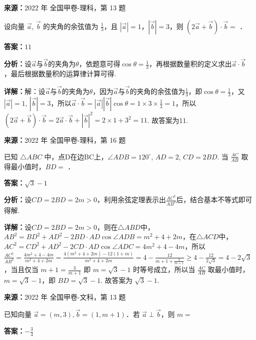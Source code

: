 \begin{question}[points=5]
\textbf{来源：}2022 年 全国甲卷-理科，第 13 题\par
设向量 $\vec{a}$, $\vec{b}$ 的夹角的余弦值为 $\frac{1}{3}$，且 $|\vec{a}|=1$，$|\vec{b}|=3$，则 $(2\vec{a}+\vec{b})\cdot\vec{b}=$ ．
\fillin[{$11$}]
\begin{solution}
\textbf{答案：}$11$

\textbf{分析：}设$\vec{a}$与$\vec{b}$的夹角为$\theta$，依题意可得$\cos\theta=\frac{1}{3}$，再根据数量积的定义求出$\vec{a}\cdot\vec{b}$，最后根据数量积的运算律计算可得.

\textbf{详解：}解：设$\vec{a}$与$\vec{b}$的夹角为$\theta$，因为$\vec{a}$与$\vec{b}$的夹角的余弦值为$\frac{1}{3}$，即$\cos\theta=\frac{1}{3}$，又$|\vec{a}|=1$, $|\vec{b}|=3$，所以$\vec{a}\cdot\vec{b}=|\vec{a}||\vec{b}|\cos\theta=1\times3\times\frac{1}{3}=1$，所以$(2\vec{a}+\vec{b})\cdot\vec{b}=2\vec{a}\cdot\vec{b}+|\vec{b}|^2=2\times1+3^2=11$. 故答案为11.
\end{solution}
\end{question}

\begin{question}[points=5]
\textbf{来源：}2022 年 全国甲卷-理科，第 16 题\par
已知 $\triangle ABC$ 中，点D在边BC上，$\angle ADB=120^\circ$, $AD=2$, $CD=2BD$. 当 $\frac{AC}{AB}$ 取得最小值时，$BD=$ ．
\fillin[{$\sqrt{3}-1$}]
\begin{solution}
\textbf{答案：}$\sqrt{3}-1$

\textbf{分析：}设$CD=2BD=2m>0$，利用余弦定理表示出$\frac{AC^2}{AB^2}$后，结合基本不等式即可得解.

\textbf{详解：}设$CD=2BD=2m>0$，则在$\triangle ABD$中，$AB^2=BD^2+AD^2-2BD\cdot AD\cos\angle ADB=m^2+4+2m$，在$\triangle ACD$中，$AC^2=CD^2+AD^2-2CD\cdot AD\cos\angle ADC=4m^2+4-4m$，所以 $\frac{AC^2}{AB^2}=\frac{4m^2+4-4m}{m^2+4+2m}=\frac{4(m^2+4+2m)-12(1+m)}{m^2+4+2m}=4-\frac{12}{m+1+\frac{3}{m+1}} \geq 4-\frac{12}{2\sqrt{3}}=4-2\sqrt{3}$，当且仅当 $m+1=\frac{3}{m+1}$ 即 $m=\sqrt{3}-1$ 时等号成立，所以当 $\frac{AC}{AB}$ 取最小值时，$m=\sqrt{3}-1$，即 $BD=\sqrt{3}-1$. 故答案为 $\sqrt{3}-1$.
\end{solution}
\end{question}

\begin{question}[points=5]
\textbf{来源：}2022 年 全国甲卷-文科，第 13 题\par
已知向量 $\vec{a}=(m,3),\vec{b}=(1,m+1)$．若 $\vec{a}\perp\vec{b}$，则 $m=$
\fillin[{$-\frac{3}{4}$}]
\begin{solution}
\textbf{答案：}$-\frac{3}{4}$
\end{solution}
\end{question}

